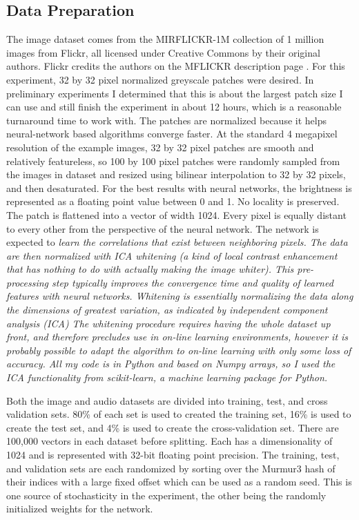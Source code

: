 \documentclass[12pt]{article}
\begin{document}
\begin{doublespacing}
	\subsection{Data Preparation}
	The image dataset comes from the MIRFLICKR-1M collection of 1 million images from Flickr, all licensed under Creative Commons by their original authors. Flickr credits the authors on the MFLICKR description page \cite{huiskes08}. For this experiment, 32 by 32 pixel normalized greyscale patches were desired. In preliminary experiments I determined that this is about the largest patch size I can use and still finish the experiment in about 12 hours, which is a reasonable turnaround time to work with. The patches are normalized because it helps neural-network based algorithms converge faster. At the standard 4 megapixel resolution of the example images, 32 by 32 pixel patches are smooth and relatively featureless, so 100 by 100 pixel patches were randomly sampled from the images in dataset and resized using bilinear interpolation to 32 by 32 pixels, and then desaturated. For the best results with neural networks, the brightness is represented as a floating point value between 0 and 1. No locality is preserved. The patch is flattened into a vector of width 1024. Every pixel is equally distant to every other from the perspective of the neural network. The network is expected to \em learn \em the correlations that exist between neighboring pixels. The data are then normalized with ICA whitening (a kind of local contrast enhancement that has nothing to do with actually making the image whiter). This pre-processing step typically improves the convergence time and quality of learned features with neural networks. Whitening is essentially normalizing the data along the dimensions of greatest variation, as indicated by independent component analysis (ICA) The whitening procedure requires having the whole dataset up front, and therefore precludes use in on-line learning environments, however it is probably possible to adapt the algorithm to on-line learning with only some loss of accuracy. All my code is in Python and based on Numpy arrays, so I used the ICA functionality from scikit-learn, a machine learning package for Python. 
	
	Both the image and audio datasets are divided into training, test, and cross validation sets. 80\% of each set is used to created the training set, 16\% is used to create the test set, and 4\% is used to create the cross-validation set. There are 100,000 vectors in each dataset before splitting. Each has a dimensionality of 1024 and is represented with 32-bit floating point precision. The training, test, and validation sets are each randomized by sorting over the Murmur3 hash of their indices with a large fixed offset which can be used as a random seed. This is one source of stochasticity in the experiment, the other being the randomly initialized weights for the network.
	

\end{doublespacing}
\end{document}
